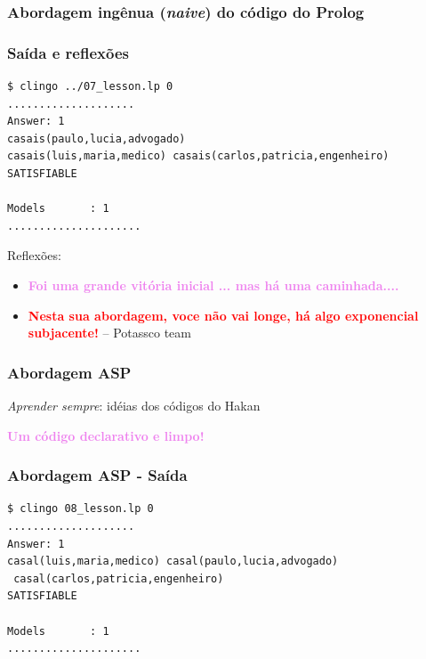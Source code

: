 \documentclass{beamer}
\begin{document}
\begin{frame}[allowframebreaks]
\frametitle{Abordagem ingênua (\emph{naive}) do código do Prolog}
		
	


\end{frame}


\begin{frame}[fragile] 
	\frametitle{Saída e reflexões}

{\small
\begin{verbatim}
$ clingo ../07_lesson.lp 0
....................
Answer: 1
casais(paulo,lucia,advogado) 
casais(luis,maria,medico) casais(carlos,patricia,engenheiro)
SATISFIABLE

Models       : 1
.....................
\end{verbatim}
}
Reflexões:
\pause
\begin{itemize}
\item \textcolor{violet}{\textbf{Foi uma grande vitória inicial ... mas há uma caminhada....}}		

\item \textcolor{red}{\textbf{Nesta sua abordagem, voce não vai longe, há algo exponencial subjacente!}} -- Potassco team	
	

\end{itemize}	

\end{frame}




\begin{frame}[allowframebreaks]
\frametitle{Abordagem ASP}

\emph{Aprender sempre}: idéias dos códigos do Hakan	
	


\textcolor{violet}{\textbf{Um código declarativo e limpo!}}	

\end{frame}




\begin{frame}[fragile]

\frametitle{Abordagem ASP - Saída}

{\small
\begin{verbatim}
$ clingo 08_lesson.lp 0
....................
Answer: 1
casal(luis,maria,medico) casal(paulo,lucia,advogado)
 casal(carlos,patricia,engenheiro)
SATISFIABLE

Models       : 1
.....................
\end{verbatim}
}


\end{frame}
\end{document}

